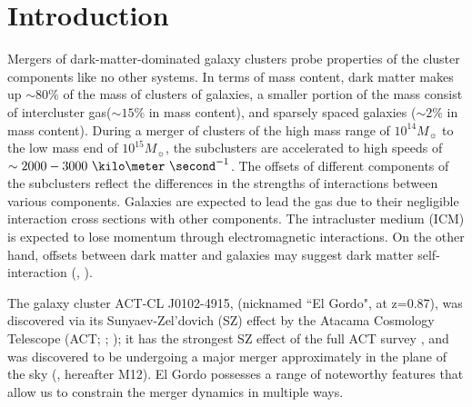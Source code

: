 \documentclass[letterpaper,useAMS,usenatbib]{mn2e}
\begin{document}
\section{Introduction} 
Mergers of dark-matter-dominated galaxy clusters probe properties
of the cluster components like no other systems. 
In terms of mass content, dark matter makes up $\sim80\%$ of the mass of clusters
of galaxies, a smaller portion of the mass consist of intercluster
gas($\sim15\%$ in mass content), and sparsely spaced galaxies ($\sim2\%$ in mass content). During a merger of
clusters of the high mass range of $10^{14} M_{\sun}$ to the low mass end of
$10^{15} M_{\sun}$, the subclusters are accelerated to high speeds of 
$\sim 2000 - 3000~\kilo \meter~\second^{-1}$. The offsets of
different components of the subclusters reflect the differences in the
strengths of interactions between various components. Galaxies are
expected to lead the gas due to their negligible interaction cross
sections with other components. The intracluster medium (ICM) is expected to lose
momentum through electromagnetic interactions. On the other hand, offsets
between dark matter and galaxies may suggest dark matter self-interaction
(\citealt{Kahlhoefer14}, \citealt{Randall2008d}).  
\par
The galaxy cluster ACT-CL J0102-4915, (nicknamed ``El Gordo", at z=0.87),
was discovered via its Sunyaev-Zel'dovich (SZ) effect by the Atacama Cosmology Telescope (ACT;
\citealt{Menanteau2010}; \citealt{Marriage11}); it has the strongest SZ
effect of the full ACT survey \citep{Hasselfield2013}, and was discovered
to be undergoing a major merger approximately in the plane of the sky
(\citealt{M12}, hereafter M12). El Gordo possesses a range of noteworthy features that allow us to constrain the merger dynamics in multiple ways. 
\end{document}
